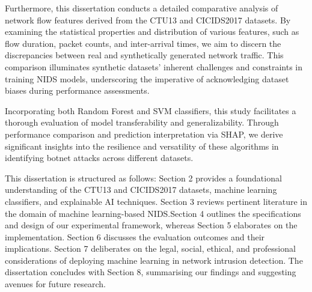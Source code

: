 Furthermore, this dissertation conducts a detailed comparative analysis of network flow features derived from the CTU13 and CICIDS2017 datasets. By examining the statistical properties and distribution of various features, such as flow duration, packet counts, and inter-arrival times, we aim to discern the discrepancies between real and synthetically generated network traffic. This comparison illuminates synthetic datasets' inherent challenges and constraints in training NIDS models, underscoring the imperative of acknowledging dataset biases during performance assessments.

Incorporating both Random Forest and SVM classifiers, this study facilitates a thorough evaluation of model transferability and generalizability. Through performance comparison and prediction interpretation via SHAP, we derive significant insights into the resilience and versatility of these algorithms in identifying botnet attacks across different datasets.

This dissertation is structured as follows: Section 2 provides a foundational understanding of the CTU13 and CICIDS2017 datasets, machine learning classifiers, and explainable AI techniques. Section 3 reviews pertinent literature in the domain of machine learning-based NIDS.\@ Section 4 outlines the specifications and design of our experimental framework, whereas Section 5 elaborates on the implementation. Section 6 discusses the evaluation outcomes and their implications. Section 7 deliberates on the legal, social, ethical, and professional considerations of deploying machine learning in network intrusion detection. The dissertation concludes with Section 8, summarising our findings and suggesting avenues for future research.
